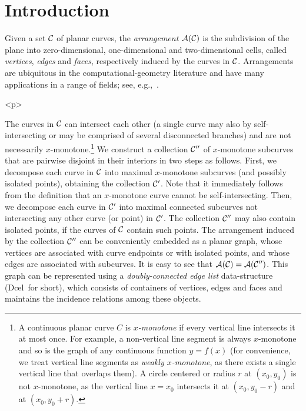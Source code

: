 \newcommand{\reals}{{\rm I\!\hspace{-0.025em} R}}
\newcommand{\calC}{{\cal C}}
\newcommand{\calA}{{\cal A}}
\newcommand{\eps}{{\varepsilon}}
\newcommand{\dcel}{{\sc Dcel}}
\newcommand{\naive}{na\"{\i}ve}
\newcommand{\kdtree}{{\sc Kd}-tree}
\newcommand{\boost}{{\sc Boost}}
\newcommand{\Cpp}{{C}{\tt ++}}

\newcommand{\htmlP}{\begin{ccHtmlOnly}<p>\end{ccHtmlOnly}}

\section{Introduction}
\label{arr_sec:intro}
%
Given a set $\calC$ of planar curves, the {\em arrangement}
$\calA(\calC)$ is the subdivision of the plane into zero-dimensional,
one-dimensional and two-dimensional cells, called {\em vertices}, {\em
edges} and {\em faces}, respectively induced by the curves in $\calC$.
Arrangements are ubiquitous in the computational-geometry
literature and have many applications in a range of fields;
see, e.g.,~\cite{as-aa-00,cgal:h-a-04}.

\begin{ccHtmlOnly}<p>\end{ccHtmlOnly}
The curves in $\calC$ can intersect each other (a single curve may also
by self-intersecting or may be comprised of several disconnected branches)
and are not necessarily $x$-monotone.\footnote{A continuous planar curve $C$
is {\em $x$-monotone} if every vertical line intersects it at
most once. For example, a non-vertical line segment is always
$x$-monotone and so is the graph of any continuous function $y = f(x)$
(for convenience, we treat vertical line segments as {\em weakly
$x$-monotone}, as there exists a single vertical line that overlaps them).
A circle centered or radius $r$ at $(x_0, y_0)$ is not $x$-monotone, as
the vertical line $x = x_0$ intersects it at $(x_0, y_0 - r)$ and at
$(x_0, y_0 + r)$.}
We construct a collection $\calC''$ of
$x$-monotone subcurves that are pairwise disjoint in their interiors
in two steps as follows. First, we decompose each curve in $\calC$
into maximal $x$-monotone subcurves (and possibly isolated points),
obtaining the collection $\calC'$. Note that it immediately follows
from the definition that an $x$-monotone curve cannot be
self-intersecting. Then, we decompose each curve in $\calC'$ into
maximal connected subcurves not intersecting any other
curve (or point) in $\calC'$. The collection $\calC''$ may also
contain isolated points, if the curves of $\calC$ contain such
points. The arrangement induced by the collection $\calC''$ can be
conveniently embedded as a planar graph, whose vertices are associated
with curve endpoints or with isolated points, and whose edges are
associated with subcurves. It is easy to see that
$\calA(\calC) = \calA(\calC'')$. This graph can be represented using a
{\em doubly-connected edge list} data-structure (\dcel\ for short),
which consists of containers of vertices, edges and faces and
maintains the incidence relations among these objects.


